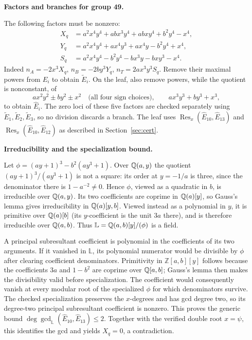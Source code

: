 \documentclass[11pt]{amsart}
\newcommand{\topic}[1]{\par\addvspace{1.4ex}\noindent\textbf{#1}\par\nobreak\smallskip\noindent}
\newcommand{\Z}{\mathbb{Z}}
\theoremstyle{definition}\newtheorem{definition}[theorem]{Definition}\theoremstyle{remark}\newtheorem{remark}[theorem]{Remark}
\begin{document}
\topic{Factors and branches for group 49.} The following factors must be nonzero:
\[
\begin{aligned}
 X_q&=a^2x^4y^4+abx^3y^4+abxy^4+b^2y^4-x^4,\\
 Y_q&=a^2x^4y^4+ax^4y^3+ax^4y-b^2y^4+x^4,\\
 S_q&=a^2x^4y^4-b^2y^4-bx^3y-bxy^3-x^4.
\end{aligned}
\]
Indeed $n_A=-2x^3X_q$, $n_B=-2by^3Y_q$, $n_T=2ax^3y^3S_q$. Remove their maximal powers from $E_i$ to obtain $\widetilde E_i$. On the leaf, also remove powers, while the quotient is nonconstant, of
\[
 ax^2y^2\pm by^2\pm x^2\quad\text{(all four sign choices)},
 \qquad ax^3y^3+by^3+x^3,
\]
to obtain $\widehat E_i$. The zero loci of these five factors are checked separately using $\widetilde E_1,\widetilde E_2,\widetilde E_3$, so no division discards a branch. The leaf uses $\operatorname{Res}_x(\widehat E_{10},\widehat E_{13})$ and $\operatorname{Res}_x(\widehat E_{10},\widehat E_{12})$ as described in Section~\ref{sec:cert}.

\topic{Irreducibility and the specialization bound.} Let
$\phi=(ay+1)^3-b^2(ay^3+1)$. Over $\mathbb{Q}(a,y)$ the quotient
$(ay+1)^3/(ay^3+1)$ is not a square: its order at $y=-1/a$ is three, since the denominator there is $1-a^{-2}\ne0$. Hence $\phi$, viewed as a quadratic in $b$, is irreducible over $\mathbb{Q}(a,y)$. Its two coefficients are coprime in $\mathbb{Q}(a)[y]$, so Gauss's lemma gives irreducibility in $\mathbb{Q}(a)[y,b]$. Viewed instead as a polynomial in $y$, it is primitive over $\mathbb{Q}(a)[b]$ (its $y$-coefficient is the unit $3a$ there), and is therefore irreducible over $\mathbb{Q}(a,b)$. Thus $\mathbb L=\mathbb{Q}(a,b)[y]/(\phi)$ is a field.

A principal subresultant coefficient is polynomial in the coefficients of its two arguments. If it vanished in $\mathbb L$, its polynomial numerator would be divisible by $\phi$ after clearing coefficient denominators. Primitivity in $\Z[a,b][y]$ follows because the coefficients $3a$ and $1-b^2$ are coprime over $\mathbb{Q}[a,b]$; Gauss's lemma then makes the divisibility valid before specialization. The coefficient would consequently vanish at every modular root of the specialized $\phi$ for which denominators survive. The checked specialization preserves the $x$-degrees and has gcd degree two, so its degree-two principal subresultant coefficient is nonzero. This proves the generic bound $\deg\gcd_{\mathbb L}(\widehat E_{10},\widehat E_{13})\le2$. Together with the verified double root $x=\psi$, this identifies the gcd and yields $X_q=0$, a contradiction.
\end{document}
